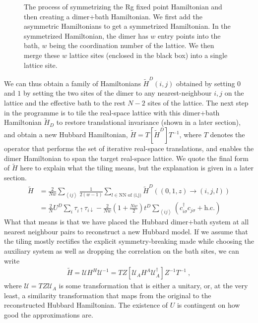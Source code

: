 \documentclass[10pt]{report}
\numberwithin{equation}{section}
\begin{document}
{\begin{figure}[htpb]
 	\caption{The process of symmetrizing the Rg fixed point Hamiltonian and then creating a dimer+bath Hamiltonian. We first add the asymmetric Hamiltonians to get a symmetrized Hamiltonian. In the symmetrized Hamiltonian, the dimer has \(w\) entry points into the bath, \(w\) being the coordination number of the lattice. We then merge these \(w\) lattice sites (enclosed in the black box) into a single lattice site.}
 	\label{dimer-bath} 
 \end{figure}
 We  can thus obtain a family of Hamiltonians \(\tilde H^D(i,j)\) obtained by setting \(0\) and \(1\) by setting the two sites of the dimer to any nearest-neighbour \(i,j\) on the lattice and the effective bath to the rest \(N-2\) sites of the lattice. The next step in the programme is to tile the real-space lattice with this dimer+bath Hamiltonian \(\tilde H_D\) to restore translational invariance (shown in a later section), and obtain a new Hubbard Hamiltonian, $\tilde H = T\left[ \tilde H^{D} \right] T^{-1}$, where $T$ denotes the operator that performs the set of iterative real-space translations, and enables the dimer Hamiltonian to span the target real-space lattice. We quote the final form of $\tilde H$ here to explain what the tiling means, but the explanation is given in a later section.
 \begin{equation}\begin{aligned}
 	\tilde H &= \frac{2}{Nw}\sum_{\left<ij\right>}\frac{1}{2(w-1)}\sum_{l \in \text{NN of (i,j)}}\tilde H^D((0,1,z) \to (i, j, l))\\
 		 &= \frac{2}{N}U^D\sum_{i} \tau_{i \uparrow}\tau_{i \downarrow} - \frac{2}{Nw}\left(1 + \frac{Nw}{2}\right)t^D\sum_{\left<ij\right>}\left(c^\dagger_{i\sigma}c_{j\sigma} + \text{h.c.}\right)
 \end{aligned}\end{equation}
 What that means is that we have placed the Hubbard dimer+bath system at all nearest neighbour pairs to reconstruct a new Hubbard model. If we assume that the tiling mostly rectifies the explicit symmetry-breaking made while choosing the auxiliary system as well as dropping the correlation on the bath sites, we can write
 \begin{equation}\begin{aligned}
 	\tilde H = \mathcal{U} H^H \mathcal{U}^{-1} = TZ\left[\mathcal{U}_A H^A \mathcal{U}_A^\dagger \right]Z^{-1} T^{-1}~,
 \end{aligned}\end{equation}
 where $\mathcal{U} = TZ\mathcal{U}_{A}$ is some transformation that is either a unitary, or, at the very least, a similarity transformation that maps from the original to the reconstructed Hubbard Hamiltonian. 
 The existence of $U$ is contingent on how good the approximations are.
 
}
\end{document}
